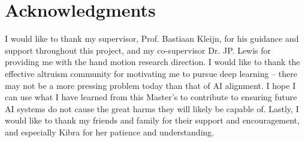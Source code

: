 \chapter*{Acknowledgments}
\label{C:ack}

I would like to thank my supervisor, Prof. Bastiaan Kleijn, for his guidance and support throughout this project, and my co-supervisor Dr. JP. Lewis for providing me with the hand motion research direction. I would like to thank the effective altruism community for motivating me to pursue deep learning -- there may not be a more pressing problem today than that of AI alignment. I hope I can use what I have learned from this Master's to contribute to ensuring future AI systems do not cause the great harms they will likely be capable of. Lastly, I would like to thank my friends and family for their support and encouragement, and especially Kibra for her patience and understanding.

